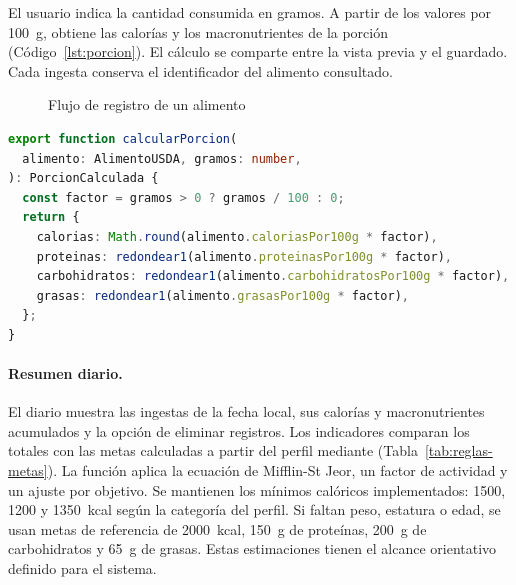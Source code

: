 El usuario indica la cantidad consumida en gramos. A partir de los valores
por 100~g,  obtiene las calorías y los
macronutrientes de la porción (Código~\ref{lst:porcion}). El cálculo se
comparte entre la vista previa y el guardado. Cada ingesta conserva el
identificador  del alimento consultado.

\begin{figure}[H]
\centering
{}
\caption{Flujo de registro de un alimento}
\label{fig:flujo-diario}
\end{figure}

\begin{lstlisting}[language=TypeScript, caption={Cálculo de la porción consumida}, label={lst:porcion}]
export function calcularPorcion(
  alimento: AlimentoUSDA, gramos: number,
): PorcionCalculada {
  const factor = gramos > 0 ? gramos / 100 : 0;
  return {
    calorias: Math.round(alimento.caloriasPor100g * factor),
    proteinas: redondear1(alimento.proteinasPor100g * factor),
    carbohidratos: redondear1(alimento.carbohidratosPor100g * factor),
    grasas: redondear1(alimento.grasasPor100g * factor),
  };
}
\end{lstlisting}

\paragraph{Resumen diario.} El diario muestra las ingestas de la fecha local,
sus calorías y macronutrientes acumulados y la opción de eliminar registros.
Los indicadores comparan los totales con las metas calculadas a partir del
perfil mediante 
(Tabla~\ref{tab:reglas-metas}). La función aplica la ecuación de Mifflin-St Jeor,
un factor de actividad y un ajuste por objetivo. Se mantienen los mínimos
calóricos implementados: 1500, 1200 y 1350~kcal según la categoría del perfil.
Si faltan peso, estatura o edad, se usan metas de referencia de 2000~kcal,
150~g de proteínas, 200~g de carbohidratos y 65~g de grasas.
Estas estimaciones tienen el alcance orientativo definido para el sistema.

